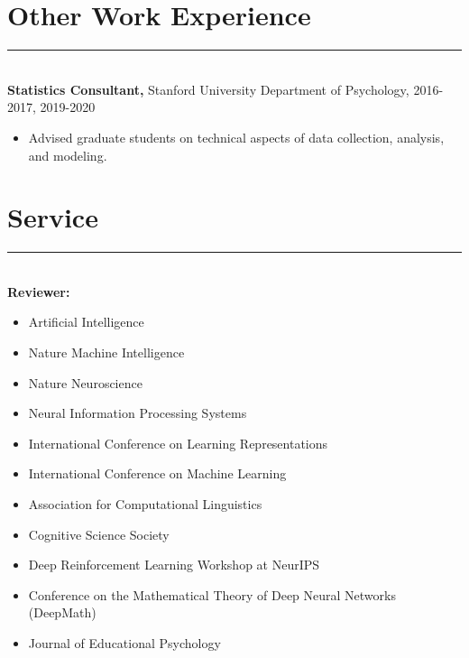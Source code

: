 \documentclass[margin]{res}
\begin{document}
\begin{resume}
\vspace{1pt}\section{Other Work Experience} \vspace{-15pt} \rule{\textwidth}{0.5pt} \\[3pt]
{\bf Statistics Consultant,} Stanford University Department of Psychology, 2016-2017, 2019-2020
\begin{itemize} \itemsep -2pt
 \item Advised graduate students on technical aspects of data collection, analysis, and modeling. \end{itemize}
\vspace{1pt}\section{Service} \vspace{-15pt} \rule{\textwidth}{0.5pt} \\[3pt]
{\bf Reviewer:} 
\begin{itemize} \itemsep -2pt
 \item Artificial Intelligence
 \item Nature Machine Intelligence 
 \item Nature Neuroscience 
 \item Neural Information Processing Systems
 \item International Conference on Learning Representations 
 \item International Conference on Machine Learning
 \item Association for Computational Linguistics
 \item Cognitive Science Society
 \item Deep Reinforcement Learning Workshop at NeurIPS
 \item Conference on the Mathematical Theory of Deep Neural Networks (DeepMath)
 \item Journal of Educational Psychology
 \end{itemize}

\end{resume}
\end{document}
